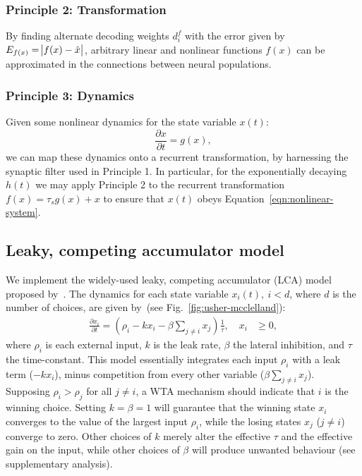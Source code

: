 \documentclass[10pt,letterpaper]{article}
\begin{document}
\subsubsection{Principle 2: Transformation}
By finding alternate decoding weights $d^f_i$ with the error given by $E_{f(x)} = \abs{f(x) - \hat x}$, arbitrary linear and nonlinear functions $f(x)$ can be approximated in the connections between neural populations.

\subsubsection{Principle 3: Dynamics}
Given some nonlinear dynamics for the state variable $x(t)$:
\begin{equation} \label{eqn:nonlinear-system}
    \frac{\partial x}{\partial t} = g(x) ,
\end{equation}
we can map these dynamics onto a recurrent transformation, by harnessing the synaptic filter used in Principle 1.
In particular, for the exponentially decaying $h(t)$ we may apply Principle 2 to the recurrent transformation $f(x) = \tau_s g(x) + x$ to ensure that $x(t)$ obeys Equation~\ref{eqn:nonlinear-system}.

\subsection{Leaky, competing accumulator model}
We implement the widely-used leaky, competing accumulator (LCA) model proposed by~.
The dynamics for each state variable $x_i(t),\ i < d$, where $d$ is the number of choices, are given by~(see Fig.~\ref{fig:usher-mcclelland}):
\begin{equation} \label{eqn:usher-mcclelland}
    \begin{split}
        \frac{{\partial x}_i}{\partial t} = \left(\rho_i - kx_i - \beta \sum_{j \neq i} x_j\right) \frac{1}{\tau}, \quad x_i &\ge 0,
    \end{split}
\end{equation}
where $\rho_i$ is each external input, $k$ is the leak rate, $\beta$ the lateral inhibition, and $\tau$ the time-constant.
This model essentially integrates each input $\rho_i$ with a leak term ($- kx_i$), minus competition from every other variable ($\beta \sum_{j \neq i} x_j$).
Supposing $\rho_i > \rho_j$ for all $j \ne i$, a WTA mechanism should indicate that $i$ is the winning choice.
Setting $k = \beta = 1$ will guarantee that the winning state $x_i$ converges to the value of the largest input $\rho_i$, while the losing states $x_j$ ($j \ne i$) converge to zero.
Other choices of $k$ merely alter the effective $\tau$ and the effective gain on the input, while other choices of $\beta$ will produce unwanted behaviour (see supplementary analysis).
\end{document}
